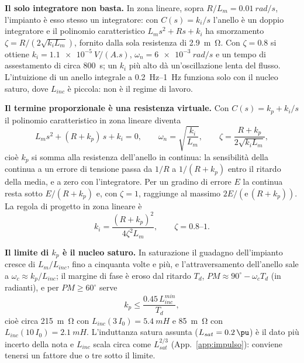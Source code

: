 \documentclass[10pt,a4paper]{scrartcl}
\newcommand{\ee}{\mathrm{e}}
\newcommand{\Lm}{L_m}
\newcommand{\Lsat}{L_{sat}}
\newcommand{\Linc}{L_{inc}}
\newcommand{\Izero}{I_0}
\newcommand{\kp}{k_p}
\newcommand{\ki}{k_i}
\begin{document}
\begin{onehalfspace}
\textbf{Il solo integratore non basta.} In zona lineare, sopra $R/\Lm = \SI{0.01}{rad/s}$, l'impianto è esso stesso un integratore: con $C(s) = \ki/s$ l'anello è un doppio integratore e il polinomio caratteristico $\Lm s^2 + R s + \ki$ ha smorzamento $\zeta = R/(2\sqrt{\ki\Lm})$, fornito dalla sola resistenza di \SI{2.9}{m\ohm}. Con $\zeta = \num{0.8}$ si ottiene $\ki = \SI{1.1e-5}{V\per(A.s)}$, $\omega_n = \SI{6e-3}{rad/s}$ e un tempo di assestamento di circa \SI{800}{s}; un $\ki$ più alto dà un'oscillazione lenta del flusso. L'intuizione di un anello integrale a \SIrange{0.2}{1}{Hz} funziona solo con il nucleo saturo, dove $\Linc$ è piccola: non è il regime di lavoro.

\textbf{Il termine proporzionale è una resistenza virtuale.} Con $C(s) = \kp + \ki/s$ il polinomio caratteristico in zona lineare diventa
\begin{equation}
\Lm s^2 + (R + \kp)\,s + \ki = 0, \qquad \omega_n = \sqrt{\frac{\ki}{\Lm}}, \qquad \zeta = \frac{R + \kp}{2\sqrt{\ki\Lm}},
\label{eq:caratteristico}
\end{equation}
cioè $\kp$ si somma alla resistenza dell'anello in continua: la sensibilità della continua a un errore di tensione passa da $1/R$ a $1/(R + \kp)$ entro il ritardo della media, e a zero con l'integratore. Per un gradino di errore $E$ la continua resta sotto $E/(R + \kp)$ e, con $\zeta = 1$, raggiunge al massimo $2E/(\ee\,(R + \kp))$. La regola di progetto in zona lineare è
\begin{equation}
\ki = \frac{(R + \kp)^2}{4\zeta^2\Lm}, \qquad \zeta = \numrange{0.8}{1}.
\label{eq:ki}
\end{equation}

\textbf{Il limite di $\kp$ è il nucleo saturo.} In saturazione il guadagno dell'impianto cresce di $\Lm/\Linc$, fino a cinquanta volte e più, e l'attraversamento dell'anello sale a $\omega_c \approx \kp/\Linc$; il margine di fase è eroso dal ritardo $T_d$, $PM \approx 90^\circ - \omega_c T_d$ (in radianti), e per $PM \ge 60^\circ$ serve
\begin{equation}
\kp \le \frac{\num{0.45}\,\Linc^{min}}{T_d} ,
\label{eq:kpmax}
\end{equation}
cioè circa \SI{215}{m\ohm} con $\Linc(3\,\Izero) = \SI{5.4}{mH}$ e \SI{85}{m\ohm} con $\Linc(10\,\Izero) = \SI{2.1}{mH}$. L'induttanza satura assunta ($\Lsat = \SI{0.2}{\pu}$) è il dato più incerto della nota e $\Linc$ scala circa come $\Lsat^{2/3}$ (App.~\ref{app:impulso}): conviene tenersi un fattore due o tre sotto il limite.


\end{onehalfspace}
\end{document}
